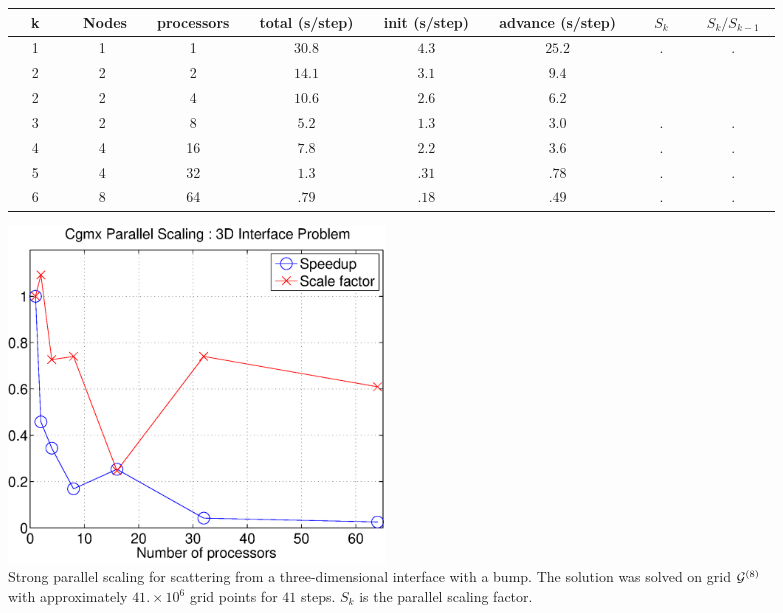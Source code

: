 \begin{figure}[hbt]
\begin{center}\small
%
\begin{tabular}{|c|c|c|c|c|c|c|c|} \hline
~~k~~&~ Nodes~  &~processors~&~total (s/step)~ &~init (s/step)~  &~advance (s/step)~ &  ~~$S_k$~~&  ~$S_k/S_{k-1}$~ \\ \hline
 1 &    1     &    1       & $30.8$   & $4.3$    & $25.2$   &  $.   $  & ~$.   $~            \\ 
 2 &    2     &    2       & $14.1$   & $3.1$    & $9.4$    &  $    $  & ~$    $~            \\ 
 2 &    2     &    4       & $10.6$   & $2.6$    & $6.2$    &  $    $  & ~$    $~            \\ 
 3 &    2     &    8       & $5.2$    & $1.3$    & $3.0$    &  $.   $  & ~$.   $~            \\
 4 &    4     &   16       & $7.8$    & $2.2$    & $3.6$    &  $.   $  & ~$.   $~            \\
 5 &    4     &   32       & $1.3$    & $.31$    & $.78$    &  $.   $  & ~$.   $~            \\
 6 &    8     &   64       & $.79$    & $.18$    & $.49$    &  $.   $  & ~$.   $~            \\
\hline
\end{tabular}
%
\includegraphics[width=10cm]{cgmxInterfaceParallelSpeedup.eps}
%
\caption{Strong parallel scaling for scattering from a three-dimensional interface with a bump.
The solution was solved
on grid ${\mathcal G}^{(8)}$ with approximately $41.\times10^{6}$ grid points for $41$ steps. $S_k$ is the 
parallel scaling factor. }
\label{fig:bump3dParallelScalingII}
\end{center}
\end{figure}
